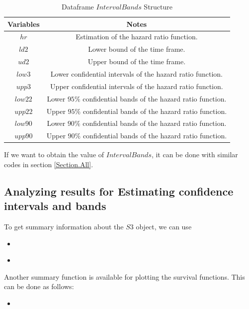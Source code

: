 \documentclass[12pt]{article}
\newcommand{\insertcode}[2]{\begin{itemize}\item[]\end{itemize}} %
\begin{document}
\begin{table}[!h]
\renewcommand{\arraystretch}{1.3}
\caption{Dataframe $IntervalBands$ Structure} \label{Tab:EstimateStructure} \centering
\begin{tabular}{|c||c|}
  \hline
  Variables & Notes  \\
  \hline
  $hr$ & Estimation of the hazard ratio function.\\
  $ld2$ & Lower bound of the time frame. \\
  $ud2$ & Upper bound of the time frame.\\
  $low3$ & Lower confidential intervals of the hazard ratio function. \\
  $upp3$ & Upper confidential intervals of the hazard ratio function.\\
  $low22$ & Lower $95\%$ confidential bands of the hazard ratio function. \\
  $upp22$ & Upper $95\%$ confidential bands of the hazard ratio function. \\
  $low90$ & Lower $90\%$ confidential bands of the hazard ratio function.  \\
  $upp90$ & Upper $90\%$ confidential bands of the hazard ratio function. \\
  \hline
\end{tabular}
\end{table}

If we want to obtain the value of $IntervalBands$, it can be done with similar codes in section \ref{Section.All}.

\subsection{Analyzing results for Estimating confidence intervals and bands}
To get summary information about the $S3$ object, we can use

\insertcode{"Scripts/code16.pl"}{Summarizing estimates' results of confidence intervals and bands.}
\insertcode{"Scripts/result16.pl"}{Results of scripts.}

Another summary function is available for plotting the survival functions. This can be done as follows:
\insertcode{"Scripts/code17.pl"}{Plotting estimates' results of confidence intervals and bands.}
\end{document}

